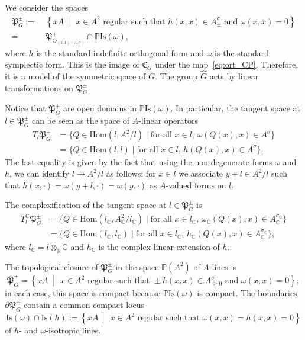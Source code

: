 \documentclass[oneside,11pt]{amsart}
\theoremstyle{definition}
\theoremstyle{remark}
\newcommand{\midwd}{\,\middle\vert\,}
\numberwithin{thm}{section}
\numberwithin{equation}{section}
\begin{document}
We consider the spaces
\begin{align*}
    \mathfrak{P}_G^\pm:=&\;\left\{xA\midwd\; x\in A^{2}\text{ regular such that }h(x,x)\in A^\sigma_{\pm}\text{ and }\omega(x,x)=0 \right\}\\
    =&\;\mathfrak{P}_{\mathrm{O}_{(1,1)(A,\sigma)}}^\pm\cap\mathbb P\mathrm{Is}(\omega),
\end{align*}
where $h$ is the standard indefinite orthogonal form and $\omega$ is the standard symplectic form. This is the image of $\mathfrak{C}_{G}$ under the map~\eqref{eq:ort_CP}. Therefore, it is a model of the symmetric space of $G$. The group $\hat G$ acts by linear transformations on $\mathfrak{P}_{G}^\pm$.

Notice that $\mathfrak{P}_G^\pm$ are open domains in $\mathbb {P}\mathrm{Is}(\omega)$. In particular, the tangent space at $l\in\mathfrak{P}_G^\pm$ can be seen as the space of $A$-linear operators 
\begin{align*}
    T_l\mathfrak{P}_G^\pm & =\{Q\in\mathrm{Hom}(l,A^2/l)\mid \text{for all $x\in l$, }\omega(Q(x),x)\in A^\sigma\}\\
    & =\{Q\in\mathrm{Hom}(l,l)\mid \text{for all $x\in l$, } h(Q(x),x)\in A^\sigma\}.
\end{align*}
The last equality is given by the fact that using the non-degenerate forms $\omega$ and $h$, we can identify $l \to A^2/l$ as follows: for $x\in l$ we associate $y+l\in A^2/l$ such that $h(x,\cdot)=\omega(y+l,\cdot)=\omega(y,\cdot)$ as $A$-valued forms on $l$.

The complexification of the tangent space at $l\in\mathfrak{P}_G^\pm$ is
\begin{align*}
    T_l^\mathbb C\mathfrak{P}_G^\pm & =\{Q\in\mathrm{Hom}(l_\mathbb C,A_\mathbb C^2/l_\mathbb C)\mid \text{for all $x\in l_\mathbb C$, }\omega_\mathbb C(Q(x),x)\in A_\mathbb C^{\sigma_\mathbb C}\}\\
    &=\{Q\in\mathrm{Hom}(l_\mathbb C,l_\mathbb C)\mid \text{for all $x\in l_\mathbb C$, } h_\mathbb C(Q(x),x)\in A_\mathbb C^{\sigma_\mathbb C}\},    
\end{align*}
where $l_\mathbb C=l\otimes_\mathbb R\mathbb C$ and $h_\mathbb C$ is the complex linear extension of $h$.

The topological closure of $\mathfrak{P}_G^\pm$ in the space $\mathbb {P}(A^2)$ of $A$-lines is
$$\overline{\mathfrak{P}}_G^\pm=\left\{xA\midwd\; x\in A^{2}\text{ regular such that }\pm h(x,x)\in A^\sigma_{\geq 0}\text{ and }\omega(x,x)=0 \right\};$$
in each case, this space is compact because $\mathbb{P}\mathrm{Is}(\omega)$ is compact. The boundaries $\partial\mathfrak{P}_G^\pm$ contain a common compact locus 
$$
\mathrm{Is}(\omega)\cap \mathrm{Is}(h):=\left\{xA\midwd\; x\in A^{2}\text{ regular such that }\omega(x,x)=h(x,x)=0 \right\}
$$ 
of $h$- and $\omega$-isotropic lines.
\end{document}
